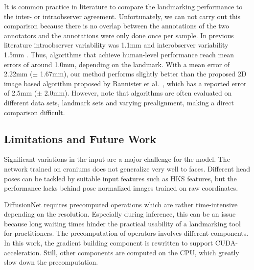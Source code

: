\documentclass[class=article, crop=false]{standalone}
\begin{document}
It is common practice in literature to compare the landmarking performance to the inter- or intraobserver agreement. Unfortunately, we can not carry out this comparison because there is no overlap between the annotations of the two annotators and the annotations were only done once per sample. In previous literature intraobserver variability was 1.1mm and interobserver variability 1.5mm \cite{Bannister2020}. Thus, algorithms that achieve human-level performance reach mean errors of around 1.0mm, depending on the landmark. With a mean error of 2.22mm ($\pm$ 1.67mm), our method performs slightly better than the proposed 2D image based algorithm proposed by Bannister et al.\ \cite{Bannister2020}, which has a reported error of 2.5mm ($\pm$ 2.0mm). However, note that algorithms are often evaluated on different data sets, landmark sets and varying prealignment, making a direct comparison difficult.



\label{sec:discussion}
\subsection{Limitations and Future Work}
Significant variations in the input are a major challenge for the model. The network trained on craniums does not generalize very well to faces. Different head poses can be tackled by suitable input features such as HKS features, but the performance lacks behind pose normalized images trained on raw coordinates. 

DiffusionNet requires precomputed operations which are rather time-intensive depending on the resolution. Especially during inference, this can be an issue because long waiting times hinder the practical usability of a landmarking tool for practitioners. The precomputation of operators involves different components. In this work, the gradient building component is rewritten to support CUDA-acceleration. Still, other components are computed on the CPU, which greatly slow down the precomputation.
\end{document}
